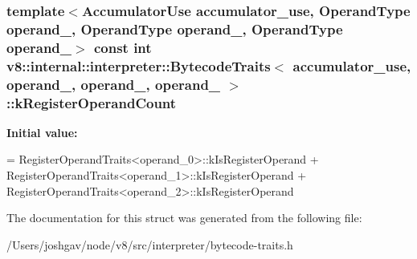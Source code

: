 \subsubsection[{\texorpdfstring{k\+Register\+Operand\+Count}{kRegisterOperandCount}}]{\setlength{\rightskip}{0pt plus 5cm}template$<$Accumulator\+Use accumulator\+\_\+use, Operand\+Type operand\+\_, Operand\+Type operand\+\_, Operand\+Type operand\+\_$>$ const int {\bf v8\+::internal\+::interpreter\+::\+Bytecode\+Traits}$<$ accumulator\+\_\+use, operand\+\_, operand\+\_, operand\+\_ $>$\+::k\+Register\+Operand\+Count\hspace{0.3cm}{\ttfamily [static]}}\hypertarget{structv8_1_1internal_1_1interpreter_1_1_bytecode_traits_3_01accumulator__use_00_01operand__0_00_7bc7f22e039a5dadb0419dc05f939673_a7acbf38243083f189af586fef470dcaf}{}\label{structv8_1_1internal_1_1interpreter_1_1_bytecode_traits_3_01accumulator__use_00_01operand__0_00_7bc7f22e039a5dadb0419dc05f939673_a7acbf38243083f189af586fef470dcaf}
{\bfseries Initial value\+:}
\begin{DoxyCode}
=
      RegisterOperandTraits<operand\_0>::kIsRegisterOperand +
      RegisterOperandTraits<operand\_1>::kIsRegisterOperand +
      RegisterOperandTraits<operand\_2>::kIsRegisterOperand
\end{DoxyCode}


The documentation for this struct was generated from the following file\+:\begin{DoxyCompactItemize}
\item 
/\+Users/joshgav/node/v8/src/interpreter/bytecode-\/traits.\+h\end{DoxyCompactItemize}
